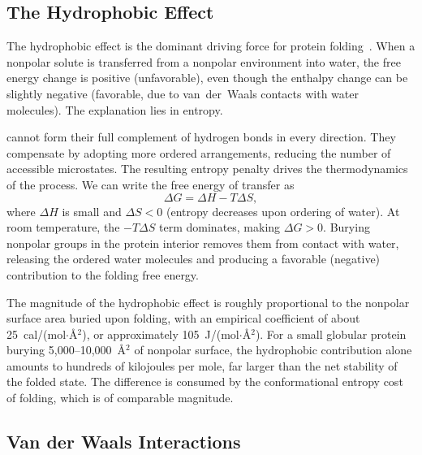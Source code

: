 \subsection{The Hydrophobic Effect}
\label{sec:hydrophobic}

The hydrophobic effect is the dominant driving force for protein folding~\cite{kauzmann1959,dill1990}.  When a nonpolar solute is transferred from a nonpolar environment into water, the free energy change is positive (unfavorable), even though the enthalpy change can be slightly negative (favorable, due to van~der~Waals contacts with water molecules).  The explanation lies in entropy.

 cannot form their full complement of hydrogen bonds in every direction.  They compensate by adopting more ordered arrangements, reducing the number of accessible microstates.  The resulting entropy penalty drives the thermodynamics of the process.  We can write the free energy of transfer as
\begin{equation}
  \Delta G = \Delta H - T\Delta S,
  \label{eq:hydrophobic}
\end{equation}
where $\Delta H$ is small and $\Delta S < 0$ (entropy decreases upon ordering of water).  At room temperature, the $-T\Delta S$ term dominates, making $\Delta G > 0$.  Burying nonpolar groups in the protein interior removes them from contact with water, releasing the ordered water molecules and producing a favorable (negative) contribution to the folding free energy.

The magnitude of the hydrophobic effect is roughly proportional to the nonpolar surface area buried upon folding, with an empirical coefficient of about 25~cal/(mol$\cdot$\AA$^2$), or approximately 105~J/(mol$\cdot$\AA$^2$).  For a small globular protein burying 5{,}000--10{,}000~\AA$^2$ of nonpolar surface, the hydrophobic contribution alone amounts to hundreds of kilojoules per mole, far larger than the net stability of the folded state.  The difference is consumed by the conformational entropy cost of folding, which is of comparable magnitude.

\subsection{Van der Waals Interactions}
\label{sec:vdw}


